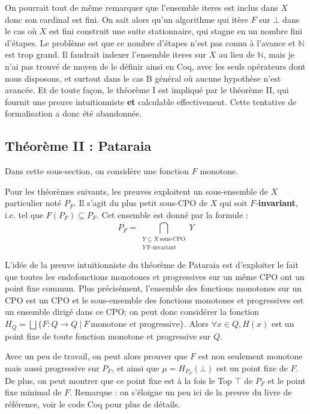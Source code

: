 \documentclass{article}
\newcommand\code[1]{{\fontfamily{lmtt}\selectfont #1}}
\theoremstyle{definition}
\begin{document}
On pourrait tout de même remarquer que l'ensemble \code{iteres} est inclus dans $X$ donc son cardinal est fini. On sait alors qu'un algorithme qui itère $F$ sur $\bot$ dans le cas où $X$ est fini construit une suite stationnaire, qui stagne en un nombre fini d'étapes. Le problème est que ce nombre d'étapes n'est pas connu à l'avance et $\mathbb{N}$ est trop grand. Il faudrait indexer l'ensemble \code{iteres} sur $X$ au lieu de $\mathbb{N}$, mais je n'ai pas trouvé de moyen de le définir ainsi en Coq, avec les seuls opérateurs dont nous disposons, et surtout dans le cas \code{B} général où aucune hypothèse n'est avancée. Et de toute façon, le théorème I est impliqué par le théorème II, qui fournit une preuve intuitionniste \textbf{et} calculable effectivement. Cette tentative de formalisation a donc été abandonnée.

\subsection{Théorème II : Pataraia}

Dans cette sous-section, on considère une fonction $F$ monotone. 

Pour les théorèmes suivants, les preuves exploitent un sous-ensemble de $X$ particulier noté $P_F$. Il s'agit du plus petit sous-CPO de $X$ qui soit $F$-\textbf{invariant}, i.e. tel que $F (P_F) \subseteq P_F$. Cet ensemble est donné par la formule : ~ 
$$P_F = \bigcap\limits_{\substack{Y \subseteq X ~ \text{sous-CPO}\\ Y ~ \text{F-invariant}}}^{}Y$$

L'idée de la preuve intuitionniste du théorème de Pataraia est d'exploiter le fait que toutes les endofonctions monotones et progressives sur un même CPO ont un point fixe commun. Plus précisément, l'ensemble des fonctions monotones sur un CPO est un CPO et le sous-ensemble des fonctions monotones et progressives est un ensemble dirigé dans ce CPO; on peut donc considérer la fonction $H_Q = \bigsqcup \{F : Q \rightarrow Q ~ | ~ F ~ \text{monotone et progressive} \}$. Alors $\forall x \in Q, H(x)$ est un point fixe de toute fonction monotone et progressive sur $Q$.

Avec un peu de travail, on peut alors prouver que $F$ est non seulement monotone mais aussi progressive sur $P_F$, et ainsi que $\mu = H_{P_F}(\bot)$ est un point fixe de $F$. De plus, on peut montrer que ce point fixe est à la fois le Top $\top$ de $P_F$ et le point fixe minimal de $F$. Remarque : on s'éloigne un peu ici de la preuve du livre de référence, voir le code Coq pour plus de détails.
\end{document}
